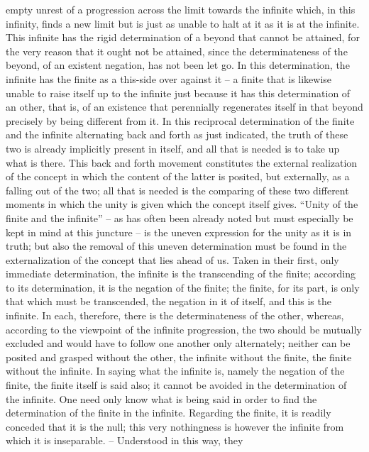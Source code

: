empty unrest of a progression across the limit towards the infinite which, in
this infinity, finds a new limit but is just as unable to halt at it as it is at the
infinite. This infinite has the rigid determination of a beyond that cannot
be attained, for the very reason that it ought not be attained, since the
determinateness of the beyond, of an existent negation, has not been let go.
In this determination, the infinite has the finite as a this-side over against it –
a finite that is likewise unable to raise itself up to the infinite just because
it has this determination of an other, that is, of an existence that perennially
regenerates itself in that beyond precisely by being different from it.
In this reciprocal determination of the finite and the infinite alternating
back and forth as just indicated, the truth of these two is already implicitly
present in itself, and all that is needed is to take up what is there. This back
and forth movement constitutes the external realization of the concept in
which the content of the latter is posited, but externally, as a falling out of
the two; all that is needed is the comparing of these two different moments
in which the unity is given which the concept itself gives. “Unity of the
finite and the infinite” – as has often been already noted but must especially
be kept in mind at this juncture – is the uneven expression for the unity as
it is in truth; but also the removal of this uneven determination must be
found in the externalization of the concept that lies ahead of us.
Taken in their first, only immediate determination, the infinite is the
transcending of the finite; according to its determination, it is the negation
of the finite; the finite, for its part, is only that which must be transcended,
the negation in it of itself, and this is the infinite. In each, therefore, there is
the determinateness of the other, whereas, according to the viewpoint of the
infinite progression, the two should be mutually excluded and would have
to follow one another only alternately; neither can be posited and grasped
without the other, the infinite without the finite, the finite without the
infinite. In saying what the infinite is, namely the negation of the finite,
the finite itself is said also; it cannot be avoided in the determination
of the infinite. One need only know what is being said in order to find
the determination of the finite in the infinite. Regarding the finite, it
is readily conceded that it is the null; this very nothingness is however
the infinite from which it is inseparable. – Understood in this way, they
